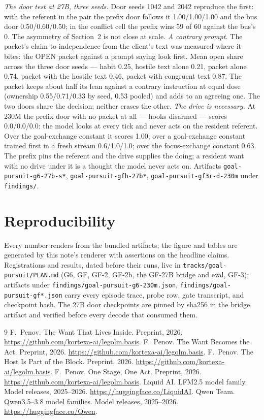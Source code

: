 \documentclass[11pt]{article}
\begin{document}
\emph{The door test at 27B, three seeds.} Door seeds 1042 and 2042
reproduce the first: with the referent in the pair the prefix door
follows it 1.00/1.00/1.00 and the bus door 0.50/0.60/0.50; in
the conflict cell the prefix wins 59 of
60 against the bus's 0.
The asymmetry of Section~2 is not close at scale.
\emph{A contrary prompt.} The packet's claim to independence from
the client's text was measured where it bites: the OPEN packet against
a prompt saying look first. Mean open share across the three door
seeds --- habit 0.25, hostile text alone
0.21, packet alone 0.74,
packet with the hostile text 0.46, packet
with congruent text 0.87. The packet keeps
about half its lean against a contrary instruction at equal dose
(ownership 0.55/0.71/0.33 by seed, 0.53 pooled) and adds to an
agreeing one. The two doors share the decision; neither erases the
other. \emph{The drive is necessary.} At 230M the prefix door with no
packet at all --- hooks disarmed --- scores 0.0/0.0/0.0: the model looks
at every tick and never acts on the resident referent. Over the
goal-exchange constant it scores 1.00; over a goal-exchange constant
trained first in a fresh stream 0.6/1.0/1.0; over the focus-exchange
constant 0.63. The prefix pins the referent and the drive supplies the
doing; a resident want with no drive under it is a thought the model
never acts on. Artifacts \texttt{goal-pursuit-g6-27b-s*},
\texttt{goal-pursuit-gfh-27b*}, \texttt{goal-pursuit-gf3r-d-230m}
under \texttt{findings/}.

\section{Reproducibility}

Every number renders from the bundled artifacts; the figure and tables
are generated by this note's renderer with assertions on the headline
claims. Registrations and results, dated before their runs, live in
\texttt{tracks/goal-pursuit/PLAN.md} (G6, GF, GF-2, GF-2b, the
GF-27B bridge and eval, GF-3); artifacts under
\texttt{findings/goal-pursuit-g6-230m.json},
\texttt{findings/goal-pursuit-gf*.json} carry every episode trace,
probe row, gate transcript, and checkpoint hash. The 27B door
checkpoints are pinned by sha256 in the bridge artifact and verified
before every decode that consumed them.\par

\begin{thebibliography}{9}
 F.~Penov. The Want That Lives Inside.
Preprint, 2026. \url{https://github.com/kortexa-ai/legolm.basis}.
 F.~Penov. The Want Becomes the Act. Preprint,
2026. \url{https://github.com/kortexa-ai/legolm.basis}.
 F.~Penov. The Host Is Part of the Block.
Preprint, 2026. \url{https://github.com/kortexa-ai/legolm.basis}.
 F.~Penov. One Stage, One Act. Preprint,
2026. \url{https://github.com/kortexa-ai/legolm.basis}.
 Liquid AI. LFM2.5 model family. Model releases,
2025--2026. \url{https://huggingface.co/LiquidAI}.
 Qwen Team. Qwen3.5--3.8 model families. Model
releases, 2025--2026. \url{https://huggingface.co/Qwen}.
\end{thebibliography}
\end{document}
